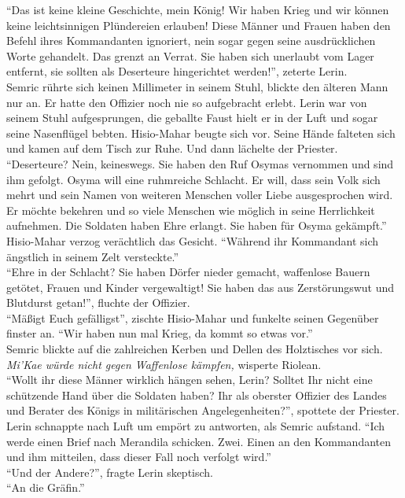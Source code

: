 ``Das ist keine kleine Geschichte, mein König! Wir haben Krieg und wir können keine leichtsinnigen 
Plündereien erlauben! Diese Männer und Frauen haben den Befehl ihres Kommandanten ignoriert, nein 
sogar gegen seine ausdrücklichen Worte gehandelt. Das grenzt an Verrat. Sie haben sich unerlaubt 
vom Lager entfernt, sie sollten als Deserteure hingerichtet werden!'', zeterte Lerin.\\
Semric rührte sich keinen Millimeter in seinem Stuhl, blickte den älteren Mann nur an. Er hatte den 
Offizier noch nie so aufgebracht erlebt. Lerin war von seinem Stuhl aufgesprungen, die geballte 
Faust hielt er in der Luft und sogar seine Nasenflügel bebten. Hisio-Mahar beugte sich vor. Seine 
Hände falteten sich und kamen auf dem Tisch zur Ruhe. Und dann lächelte der Priester. ``Deserteure? 
Nein, keineswegs. Sie haben den Ruf Osymas vernommen und sind ihm gefolgt. Osyma will eine 
ruhmreiche Schlacht. Er will, dass sein Volk sich mehrt und sein Namen von weiteren Menschen voller 
Liebe ausgesprochen wird. Er möchte bekehren und so viele Menschen wie möglich in seine 
Herrlichkeit aufnehmen. Die Soldaten haben Ehre erlangt. Sie haben für Osyma gekämpft.'' 
Hisio-Mahar verzog verächtlich das Gesicht. ``Während ihr Kommandant sich ängstlich in seinem Zelt 
versteckte.''\\
``Ehre in der Schlacht? Sie haben Dörfer nieder gemacht, waffenlose Bauern getötet, Frauen und 
Kinder vergewaltigt! Sie haben das aus Zerstörungswut und Blutdurst getan!'', fluchte der Offizier. 
\\
``Mäßigt Euch gefälligst'', zischte Hisio-Mahar und funkelte seinen Gegenüber finster an. ``Wir 
haben nun mal Krieg, da kommt so etwas vor.''\\
Semric blickte auf die zahlreichen Kerben und Dellen des Holztisches vor sich. \textit{Mi'Kae würde 
nicht gegen Waffenlose kämpfen,} wisperte Riolean.\\
``Wollt ihr diese Männer wirklich hängen sehen, Lerin? Solltet Ihr nicht eine schützende Hand über 
die Soldaten haben? Ihr als oberster Offizier des Landes und Berater des Königs in militärischen 
Angelegenheiten?'', spottete der Priester.\\
Lerin schnappte nach Luft um empört zu antworten, als Semric aufstand. ``Ich werde einen Brief nach 
Merandila schicken. Zwei. Einen an den Kommandanten und ihm mitteilen, dass dieser Fall noch 
verfolgt wird.''\\
``Und der Andere?'', fragte Lerin skeptisch.\\
``An die Gräfin.''\\
